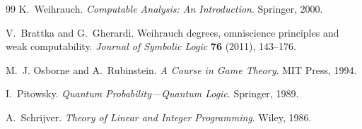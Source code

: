 \documentclass[11pt]{article}
\theoremstyle{plain}
\theoremstyle{definition}
\theoremstyle{remark}
\begin{document}
\begin{thebibliography}{99}
K.~Weihrauch. \emph{Computable Analysis: An Introduction}. Springer, 2000.


V.~Brattka and G.~Gherardi. Weihrauch degrees, omniscience principles and weak
computability. \emph{Journal of Symbolic Logic} \textbf{76} (2011), 143--176.

M.~J. Osborne and A.~Rubinstein. \emph{A Course in Game Theory}. MIT Press,
1994.

I.~Pitowsky. \emph{Quantum Probability---Quantum Logic}. Springer, 1989.


A.~Schrijver. \emph{Theory of Linear and Integer Programming}. Wiley, 1986.

\end{thebibliography}
\end{document}
